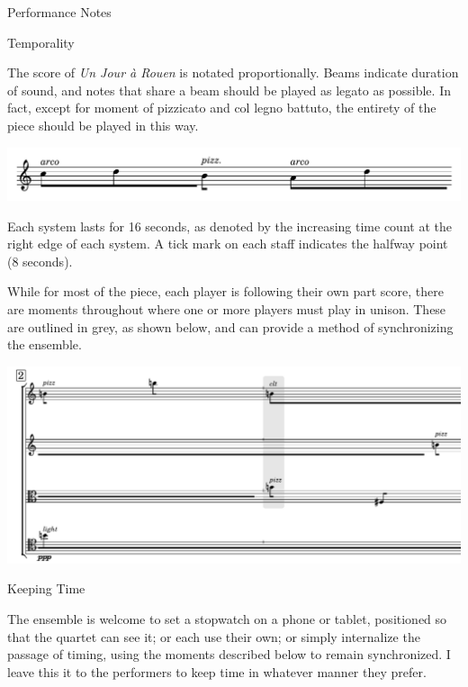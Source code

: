 \documentclass{article}
\begin{document}
\begin{center}
  {\Huge Performance Notes }
\end{center}

{\huge Temporality}

The score of \textit{Un Jour à Rouen} is notated proportionally.
Beams indicate duration of sound, and notes that share a beam should be played
as legato as possible. In fact, except for moment of pizzicato and col legno
battuto, the entirety of the piece should be played in this way.
\begin{center}
  \includegraphics[scale=.8]{./duration2.pdf}
\end{center}
Each system lasts for 16 seconds, as denoted by the increasing time count
at the right edge of each system.  A tick mark on each staff indicates
the halfway point (8 seconds).

While for most of the piece, each player is following their own part score, there
are moments throughout where one or more players must play in unison. These are
outlined in grey, as shown below, and can provide a method of synchronizing the
ensemble.

\begin{center}
  \includegraphics[scale=.8]{./score-page1-crop.pdf}
\end{center}

{\large Keeping Time}

The ensemble is welcome to set a stopwatch on a phone or tablet, positioned so
that the quartet can see it; or each use their own; or simply internalize the
passage of timing, using the moments described below to remain synchronized.
I leave this it to the performers to keep time in whatever manner they prefer.
\vspace{2em}
\end{document}
